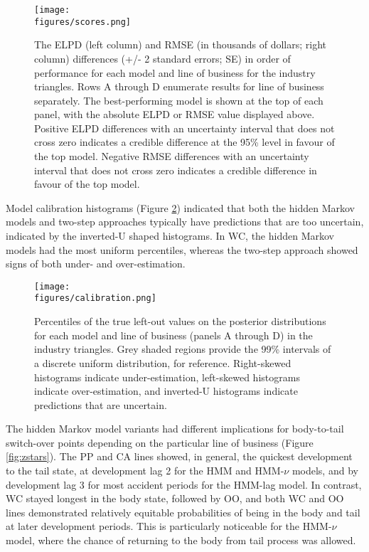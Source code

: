\begin{figure}
    \centering
    \texttt{[image: \\figures/scores.png]}
    \caption{
        The ELPD (left column) and RMSE (in thousands of dollars; right column)
		differences (+/- 2 standard errors; SE) in order of performance
        for each model and line of business for the industry
        triangles. Rows A through D enumerate results
        for line of business separately.
        The best-performing model is shown at the top of each
        panel, with the absolute ELPD or RMSE value displayed above.
        Positive ELPD differences with an uncertainty interval that does not
        cross zero indicates a credible difference at the 95\% level
        in favour of the top model.
        Negative RMSE differences with an uncertainty interval
        that does not cross zero indicates a credible difference
        in favour of the top model.
    }
	\label{fig:backtest-scores}
\end{figure}

Model calibration histograms (Figure \ref{fig:percentiles})
indicated that both the hidden Markov models
and two-step approaches typically have predictions that
are too uncertain, indicated by the inverted-U shaped
histograms. In WC, the hidden Markov models had the most
uniform percentiles, whereas the two-step approach
showed signs of both under- and over-estimation.

\begin{figure}
    \centering
    \texttt{[image: \\figures/calibration.png]}
    \caption{
        Percentiles of the true left-out values on the posterior distributions
        for each model and line of business (panels A through D) in the industry triangles.
        Grey shaded regions provide the 99\% intervals of a discrete uniform
        distribution, for reference.
        Right-skewed histograms indicate under-estimation,
        left-skewed histograms indicate over-estimation,
        and inverted-U histograms indicate predictions that
        are uncertain.
    }
    \label{fig:percentiles}
\end{figure}

The hidden Markov model variants had different
implications for body-to-tail switch-over points
depending on the particular line of business
(Figure \ref{fig:zstars}).
The PP and CA lines showed, in general,
the quickest development to the tail
state, at development lag 2 for the HMM
and HMM-$\nu$ models, and by development
lag 3 for most accident periods for the
HMM-lag model. In contrast, WC stayed
longest in the body state, followed by
OO, and both WC and OO lines demonstrated
relatively equitable probabilities of being
in the body and tail at later development
periods. This is particularly noticeable for
the HMM-$\nu$ model, where the chance
of returning to the body from tail process
was allowed.

